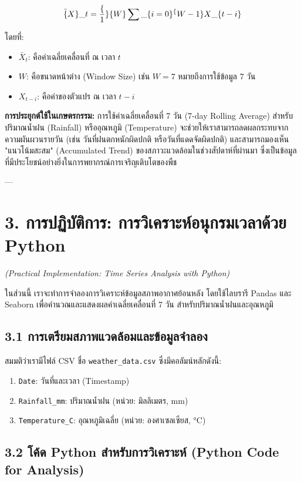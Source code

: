 \documentclass[11pt,a4paper,openany]{report}
\begin{document}
$$
\bar\{X\}\_t = \frac\{1\}\{W\} \sum\_\{i=0\}^\{W-1\} X\_\{t-i\}
$$

โดยที่:
\begin{itemize}
  \item $\bar{X}_t$: คือค่าเฉลี่ยเคลื่อนที่ ณ เวลา $t$
  \item $W$: คือขนาดหน้าต่าง (Window Size) เช่น $W=7$ หมายถึงการใช้ข้อมูล 7 วัน
  \item $X_{t-i}$: คือค่าของตัวแปร ณ เวลา $t-i$
\end{itemize}


\textbf{การประยุกต์ใช้ในเกษตรกรรม:}
การใช้ค่าเฉลี่ยเคลื่อนที่ 7 วัน (7-day Rolling Average) สำหรับปริมาณน้ำฝน (Rainfall) หรืออุณหภูมิ (Temperature) จะช่วยให้เราสามารถลดผลกระทบจากความผันผวนรายวัน (เช่น วันที่ฝนตกหนักผิดปกติ หรือวันที่แดดจัดผิดปกติ) และสามารถมองเห็น "แนวโน้มสะสม" (Accumulated Trend) ของสภาวะแวดล้อมในช่วงสัปดาห์ที่ผ่านมา ซึ่งเป็นข้อมูลที่มีประโยชน์อย่างยิ่งในการพยากรณ์การเจริญเติบโตของพืช

---

\section{3. การปฏิบัติการ: การวิเคราะห์อนุกรมเวลาด้วย Python}

\textit{(Practical Implementation: Time Series Analysis with Python)}

ในส่วนนี้ เราจะทำการจำลองการวิเคราะห์ข้อมูลสภาพอากาศย้อนหลัง โดยใช้ไลบรารี Pandas และ Seaborn เพื่อคำนวณและแสดงผลค่าเฉลี่ยเคลื่อนที่ 7 วัน สำหรับปริมาณน้ำฝนและอุณหภูมิ

\subsection{3.1 การเตรียมสภาพแวดล้อมและข้อมูลจำลอง}

สมมติว่าเรามีไฟล์ CSV ชื่อ \texttt{weather\_data.csv} ซึ่งมีคอลัมน์หลักดังนี้:
\begin{enumerate}
  \item \texttt{Date}: วันที่และเวลา (Timestamp)
  \item \texttt{Rainfall\_mm}: ปริมาณน้ำฝน (หน่วย: มิลลิเมตร, mm)
  \item \texttt{Temperature\_C}: อุณหภูมิเฉลี่ย (หน่วย: องศาเซลเซียส, °C)
\end{enumerate}


\subsection{3.2 โค้ด Python สำหรับการวิเคราะห์ (Python Code for Analysis)}
\end{document}

